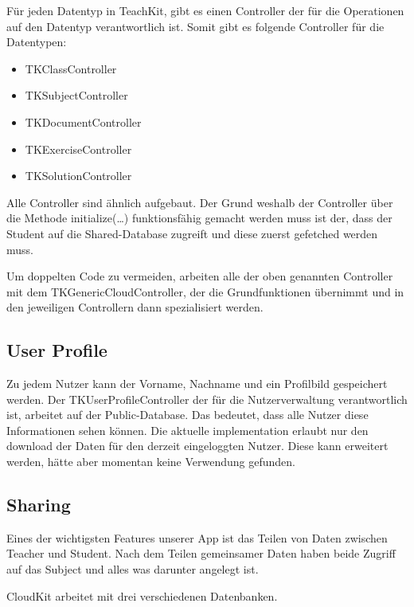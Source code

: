 Für jeden Datentyp in TeachKit, gibt es einen Controller der für die Operationen auf den Datentyp verantwortlich ist.
Somit gibt es folgende Controller für die Datentypen:

\begin{itemize}

\item TKClassController
\item TKSubjectController
\item TKDocumentController
\item TKExerciseController
\item TKSolutionController

\end{itemize}

Alle Controller sind ähnlich aufgebaut. Der Grund weshalb der Controller über die Methode initialize(…) funktionsfähig gemacht werden muss ist der, dass der Student auf die Shared-Database zugreift und diese zuerst gefetched werden muss.

Um doppelten Code zu vermeiden, arbeiten alle der oben genannten Controller mit dem TKGenericCloudController, der die Grundfunktionen übernimmt und in den jeweiligen Controllern dann spezialisiert werden.

\subsection{User Profile}

Zu jedem Nutzer kann der Vorname, Nachname und ein Profilbild gespeichert werden. Der TKUserProfileController der für die Nutzerverwaltung verantwortlich ist, arbeitet auf der Public-Database. Das bedeutet, dass alle Nutzer diese Informationen sehen können. Die aktuelle implementation erlaubt nur den download der Daten für den derzeit eingeloggten Nutzer. Diese kann erweitert werden, hätte aber momentan keine Verwendung gefunden.

\subsection{Sharing}

Eines der wichtigsten Features unserer App ist das Teilen von Daten zwischen Teacher und Student. Nach dem Teilen gemeinsamer Daten haben beide Zugriff auf das Subject und alles was darunter angelegt ist.

CloudKit arbeitet mit drei verschiedenen Datenbanken.



